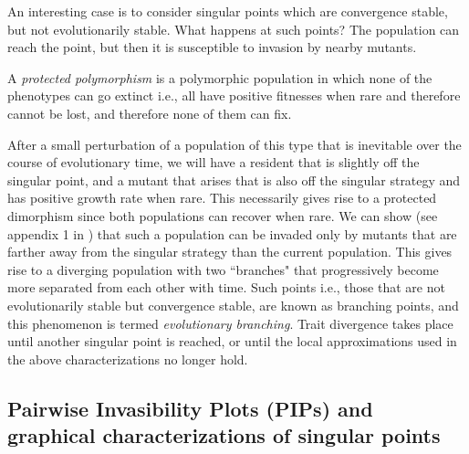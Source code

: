 An interesting case is to consider singular points which are convergence stable, but not evolutionarily stable. 
What happens at such points? 
The population can reach the point, but then it is susceptible to invasion by nearby mutants. 

\begin{definition}
	A \textit{protected polymorphism} is a polymorphic population in which none of the phenotypes can go extinct i.e., all have positive fitnesses when rare and therefore cannot be lost, and therefore none of them can fix. 
\end{definition}

After a small perturbation of a population of this type that is inevitable over the course of evolutionary time, we will have a resident that is slightly off the singular point, and a mutant that arises that is also off the singular strategy and has positive growth rate when rare. 
This necessarily gives rise to a protected dimorphism since both populations can recover when rare. 
We can show (see appendix 1 in \cite{geritz_evolutionarily_1998})  that such a population can be invaded only by mutants that are farther away from the singular strategy than the current population.
This gives rise to a diverging population with two ``branches" that progressively become more separated from each other with time. 
Such points i.e., those that are not evolutionarily stable but convergence stable, are known as branching points, and this phenomenon is termed \textit{evolutionary branching}.
Trait divergence takes place until another singular point is reached, or until the local approximations used in the above characterizations no longer hold. 

\subsection{Pairwise Invasibility Plots (PIPs) and graphical characterizations of singular points}

